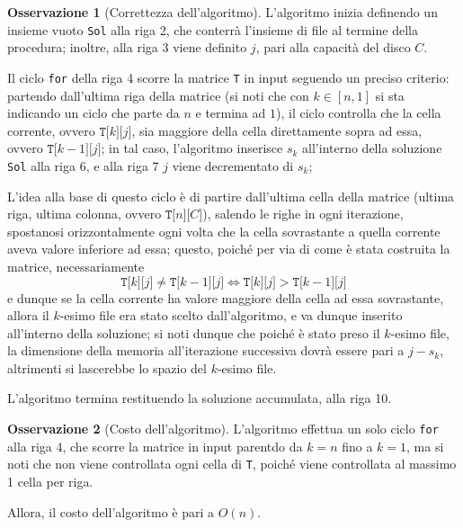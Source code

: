\documentclass[14pt]{extreport}
\theoremstyle{definition}
\theoremstyle{definition}
\newtheorem{remark}{Osservazione}[subsection]
\begin{document}
\begin{remark}[Correttezza dell'algoritmo]
    L'algoritmo inizia definendo un insieme vuoto \texttt{Sol} alla riga 2, che conterrà l'insieme di file al termine della procedura; inoltre, alla riga 3 viene definito $j$, pari alla capacità del disco $C$.

    Il ciclo \texttt{for} della riga 4 scorre la matrice \texttt{T} in input seguendo un preciso criterio: partendo dall'ultima riga della matrice (si noti che con $k \in [n, 1]$ si sta indicando un ciclo che parte da $n$ e termina ad $1$), il ciclo controlla che la cella corrente, ovvero $\texttt{T[}k\texttt{][}j\texttt{]}$, sia maggiore della cella direttamente sopra ad essa, ovvero $\texttt{T[}k - 1\texttt{][}j\texttt{]}$; in tal caso, l'algoritmo inserisce $s_k$ all'interno della soluzione \texttt{Sol} alla riga 6, e alla riga 7 $j$ viene decrementato di $s_k$;

    L'idea alla base di questo ciclo è di partire dall'ultima cella della matrice (ultima riga, ultima colonna, ovvero $\texttt{T[}n\texttt{][}C\texttt{]}$), salendo le righe in ogni iterazione, spostanosi orizzontalmente ogni volta che la cella sovrastante a quella corrente aveva valore inferiore ad essa; questo, poiché per via di come è stata costruita la matrice, necessariamente $$\texttt{T[}k\texttt{][}j\texttt{]} \neq \texttt{T[}k -1\texttt{][}j\texttt{]} \iff \texttt{T[}k\texttt{][}j\texttt{]} > \texttt{T[}k -1\texttt{][}j\texttt{]}$$ e dunque se la cella corrente ha valore maggiore della cella ad essa sovrastante, allora il $k$-esimo file era stato scelto dall'algoritmo, e va dunque inserito all'interno della soluzione; si noti dunque che poiché è stato preso il $k$-esimo file, la dimensione della memoria all'iterazione successiva dovrà essere pari a $j - s_k$, altrimenti si lascerebbe lo spazio del $k$-esimo file.

    L'algoritmo termina restituendo la soluzione accumulata, alla riga 10.
\end{remark}

\begin{remark}[Costo dell'algoritmo]
    L'algoritmo effettua un solo ciclo \texttt{for} alla riga 4, che scorre la matrice in input parentdo da $k = n$ fino a $k = 1$, ma si noti che non viene controllata ogni cella di \texttt{T}, poiché viene controllata al massimo 1 cella per riga.

    Allora, il costo dell'algoritmo è pari a $O(n)$.
\end{remark}
\end{document}
